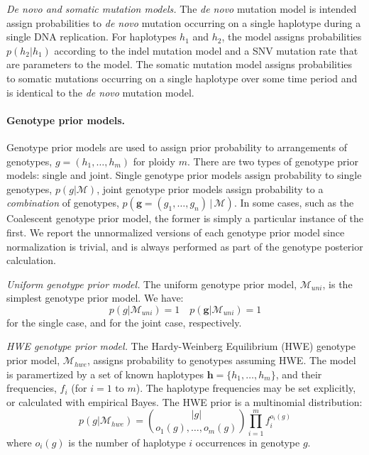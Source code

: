 \documentclass[notitlepage, twocolumn, 10pt]{article}
\begin{document}
\vspace{3mm}
\noindent\emph{De novo and somatic mutation models.} The \textit{de novo} mutation model is intended assign probabilities to \textit{de novo} mutation occurring on a single haplotype during a single DNA replication. For haplotypes $h_1$ and $h_2$, the model assigns probabilities $p(h_2 | h_1)$ according to the indel mutation model and a SNV mutation rate that are parameters to the model. The somatic mutation model assigns probabilities to somatic mutations occurring on a single haplotype over some time period and is identical to the \textit{de novo} mutation model.

\paragraph*{Genotype prior models.} Genotype prior models are used to assign prior probability to arrangements of genotypes, $g = (h_1, \dots, h_m)$ for ploidy $m$. There are two types of genotype prior models: single and joint. Single genotype prior models assign probability to single genotypes, $p(g | \mathcal{M})$, joint genotype prior models assign probability to a \emph{combination} of genotypes, $p(\boldsymbol{g} = (g_1, \dots, g_n) \, | \, \mathcal{M})$. In some cases, such as the Coalescent genotype prior model, the former is simply a particular instance of the first. We report the unnormalized versions of each genotype prior model since normalization is trivial, and is always performed as part of the genotype posterior calculation.

\vspace{3mm}
\noindent\emph{Uniform genotype prior model.} The uniform genotype prior model, $\mathcal{M}_{uni}$, is the simplest genotype prior model. We have:
\begin{equation*}
    p(g | \mathcal{M}_{uni}) = 1 \quad p(\boldsymbol{g} | \mathcal{M}_{uni}) = 1
\end{equation*}
for the single case, and for the joint case, respectively.

\vspace{3mm}
\noindent\emph{HWE genotype prior model.} The Hardy-Weinberg Equilibrium (HWE) genotype prior model, $\mathcal{M}_{hwe}$, assigns probability to genotypes assuming HWE. The model is paramertized by a set of known haplotypes $\boldsymbol{h} = \{h_1, \dots, h_m\}$, and their frequencies, $f_i$ (for $i = 1\text{ to }m$). The haplotype frequencies may be set explicitly, or calculated with empirical Bayes. The HWE prior is a multinomial distribution:
\begin{equation*}
    p(g | \mathcal{M}_{hwe}) = \binom{|g|}{o_1(g), \dots, o_m(g)} \prod_{i=1}^m f_i^{o_i(g)}
\end{equation*}
where $o_i(g)$ is the number of haplotype $i$ occurrences in genotype $g$.
\end{document}

